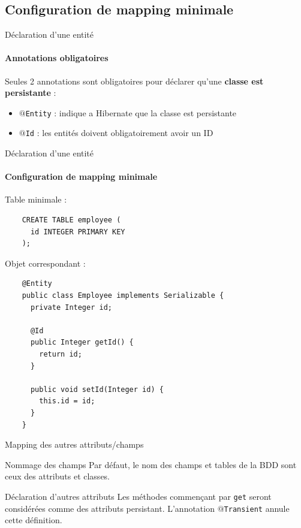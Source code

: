 \documentclass[compact]{beamer}%
\begin{document}
\subsection{Configuration de mapping minimale}
\begin{frame}{Déclaration d'une entité}
	\framesubtitle{Annotations obligatoires}
	
	Seules 2 annotations sont obligatoires pour déclarer qu'une \textbf{classe est persistante} :
	\pause
	\begin{itemize}[<+->]
		\item \texttt{$@$Entity} : indique a Hibernate que la classe est persistante
		\item \texttt{$@$Id} : les entités doivent obligatoirement avoir un ID
	\end{itemize}
	
\end{frame}

\begin{frame}[fragile]{Déclaration d'une entité}
	\framesubtitle{Configuration de mapping minimale}
	
	Table minimale : 
	\begin{lstlisting}
	CREATE TABLE employee (
	  id INTEGER PRIMARY KEY
	);
	\end{lstlisting}
	
	\pause
	Objet correspondant :
	\begin{lstlisting}
	@Entity
	public class Employee implements Serializable {
	  private Integer id;
	  
	  @Id
	  public Integer getId() {
	    return id;
	  }
	  
	  public void setId(Integer id) {
	    this.id = id;
	  }
	}
	\end{lstlisting}
	
	
\end{frame}

\begin{frame}{Mapping des autres attributs/champs}

	\begin{block}{Nommage des champs}
		Par défaut, le nom des champs et tables de la BDD sont ceux des attributs et classes.
	\end{block}

	\pause
	\begin{block}{Déclaration d'autres attributs}
		Les méthodes commençant par \texttt{get} seront considérées comme des attributs persistant. L'annotation \texttt{$@$Transient} annule cette définition.
	\end{block}
	
\end{frame}
\end{document}
